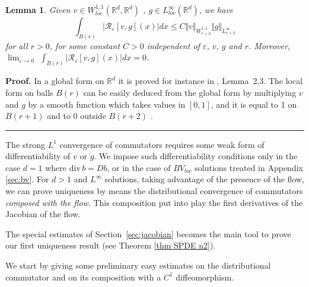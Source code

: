 \documentclass[a4paper,11pt]{article}
\newtheorem{lemma}[theorem]{Lemma}
\newenvironment{proof}[1][Proof]{\textbf{#1.} }{\ \rule{0.5em}{0.5em}}
\begin{document}
\begin{lemma}
\label{lemma:commutator-deterministic} Given $v\in W_{loc}^{1,1}(\mathbb{R}%
^{d},\mathbb{R}^{d})$ , $g\in L_{loc}^{\infty }(\mathbb{R}^{d})$, we
have
\begin{equation*}
\int_{B\left( r\right) }|\mathcal{R}_{\varepsilon }[v,g](x)|dx\leq
C\Vert v\Vert _{W_{r+2}^{1,1}}\Vert g\Vert _{L_{r+2}^{\infty }}
\end{equation*}
for all $r>0$, for some constant $C>0$ independent of $\varepsilon
$, $v$, $g $ and $r$. Moreover, $\lim_{\varepsilon \rightarrow 0}$
$\int_{B\left( r\right) }|\mathcal{R}_{\varepsilon }[v,g](x)|dx=0$.
\end{lemma}

\begin{proof}
In a global form on $\mathbb{R}^{d}$ it is proved for instance in
\cite[Ch. 2]{Lions}, Lemma~2.3. The local form on balls $B\left(
r\right) $ can be easily deduced from the global form by multiplying
$v$ and $g$ by a smooth function which takes values
in $\left[ 0,1\right] $, and it
is equal to 1 on $B\left( r+1\right) $ and to 0 outside $B\left( r+2\right) $%
.
\end{proof}

\medskip The strong $L^{1}$ convergence of commutators requires some
weak form of differentiability of $v$ or $g$. We impose such
differentiability conditions
only in the case $d=1$ where ${\mathrm{div}\,}b=Db$, or in the case of $%
BV_{loc}$ solutions treated in Appendix \ref{sec:bv}. For $d>1$ and $%
L^{\infty }$ solutions, taking advantage of the presence of the
flow, we can prove uniqueness by means the distributional
convergence of commutators \emph{composed with the flow}. This
composition put into play the first derivatives of the Jacobian of
the flow.

The special estimates of Section~\ref{sec:jacobian} becomes the main
tool to prove our first uniqueness result (see Theorem \ref{thm SPDE
n2}).

We start by giving some preliminary easy estimates on the distributional
commutator and on its composition with a $C^{1}$ diffeomorphism.
\end{document}

